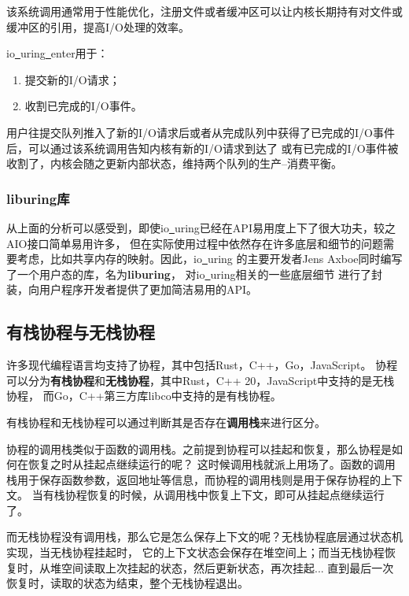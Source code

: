 \documentclass[supercite]{HustGraduPaper}
\theoremstyle{definition}
\begin{document}
该系统调用通常用于性能优化，注册文件或者缓冲区可以让内核长期持有对文件或缓冲区的引用，提高I/O处理的效率。\par

io\underline{~}uring\underline{~}enter用于：
\begin{enumerate}[label={(\arabic*)}]
  \item 提交新的I/O请求；
  \item 收割已完成的I/O事件。
\end{enumerate}

用户往提交队列推入了新的I/O请求后或者从完成队列中获得了已完成的I/O事件后，可以通过该系统调用告知内核有新的I/O请求到达了
或有已完成的I/O事件被收割了，内核会随之更新内部状态，维持两个队列的生产--消费平衡。\par

\subsubsection{liburing库}
从上面的分析可以感受到，即使io\underline{~}uring已经在API易用度上下了很大功夫，较之AIO接口简单易用许多，
但在实际使用过程中依然存在许多底层和细节的问题需要考虑，比如共享内存的映射。因此，io\underline{~}uring
的主要开发者Jens Axboe同时编写了一个用户态的库，名为\textbf{liburing}\cite{liburing.org}，
对io\underline{~}uring相关的一些底层细节
进行了封装，向用户程序开发者提供了更加简洁易用的API。\par

\subsection{有栈协程与无栈协程}
许多现代编程语言均支持了协程，其中包括Rust，C++，Go，JavaScript。
协程可以分为\textbf{有栈协程}和\textbf{无栈协程}，其中Rust，C++ 20，JavaScript中支持的是无栈协程，
而Go，C++第三方库libco中支持的是有栈协程。\par

有栈协程和无栈协程可以通过判断其是否存在\textbf{调用栈}来进行区分。\par

协程的调用栈类似于函数的调用栈。之前提到协程可以挂起和恢复，那么协程是如何在恢复之时从挂起点继续运行的呢？
这时候调用栈就派上用场了。函数的调用栈用于保存函数参数，返回地址等信息，而协程的调用栈则是用于保存协程的上下文。
当有栈协程恢复的时候，从调用栈中恢复上下文，即可从挂起点继续运行了。\par

而无栈协程没有调用栈，那么它是怎么保存上下文的呢？无栈协程底层通过状态机实现，当无栈协程挂起时，
它的上下文状态会保存在堆空间上；而当无栈协程恢复时，从堆空间读取上次挂起的状态，然后更新状态，再次挂起...
直到最后一次恢复时，读取的状态为结束，整个无栈协程退出。\par
\end{document}
